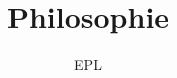 \documentclass[a4paper,12pt]{book}
\begin{document}
\author{EPL}
\title{Philosophie}


\frontmatter
\maketitle
\tableofcontents

\mainmatter



\backmatter
\end{document}

